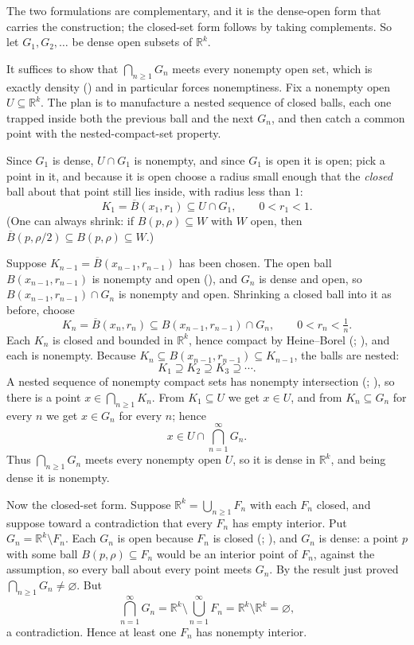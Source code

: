 \documentclass[main.tex]{subfiles}
\begin{document}
\begin{SolutionBlue}
The two formulations are complementary, and it is the dense-open form that carries the construction; the closed-set form follows by taking complements. So let $G_1,G_2,\dots$ be dense open subsets of $\mathbb R^k$.

It suffices to show that $\bigcap_{n\ge 1}G_n$ meets every nonempty open set, which is exactly density () and in particular forces nonemptiness. Fix a nonempty open $U\subseteq\mathbb R^k$. The plan is to manufacture a nested sequence of closed balls, each one trapped inside both the previous ball and the next $G_n$, and then catch a common point with the nested-compact-set property.

Since $G_1$ is dense, $U\cap G_1$ is nonempty, and since $G_1$ is open it is open; pick a point in it, and because it is open choose a radius small enough that the \emph{closed} ball about that point still lies inside, with radius less than $1$:
\[
  K_1=\overline B(x_1,r_1)\subseteq U\cap G_1,\qquad 0<r_1<1 .
\]
(One can always shrink: if $B(p,\rho)\subseteq W$ with $W$ open, then $\overline B(p,\rho/2)\subseteq B(p,\rho)\subseteq W$.)

Suppose $K_{n-1}=\overline B(x_{n-1},r_{n-1})$ has been chosen. The open ball $B(x_{n-1},r_{n-1})$ is nonempty and open (), and $G_n$ is dense and open, so $B(x_{n-1},r_{n-1})\cap G_n$ is nonempty and open. Shrinking a closed ball into it as before, choose
\[
  K_n=\overline B(x_n,r_n)\subseteq B(x_{n-1},r_{n-1})\cap G_n,\qquad 0<r_n<\tfrac1n .
\]
Each $K_n$ is closed and bounded in $\mathbb R^k$, hence compact by Heine--Borel (; ), and each is nonempty. Because $K_n\subseteq B(x_{n-1},r_{n-1})\subseteq K_{n-1}$, the balls are nested:
\[
  K_1\supseteq K_2\supseteq K_3\supseteq\cdots .
\]
A nested sequence of nonempty compact sets has nonempty intersection (; ), so there is a point $x\in\bigcap_{n\ge 1}K_n$. From $K_1\subseteq U$ we get $x\in U$, and from $K_n\subseteq G_n$ for every $n$ we get $x\in G_n$ for every $n$; hence
\[
  x\in U\cap\bigcap_{n=1}^{\infty}G_n .
\]
Thus $\bigcap_{n\ge 1}G_n$ meets every nonempty open $U$, so it is dense in $\mathbb R^k$, and being dense it is nonempty.

Now the closed-set form. Suppose $\mathbb R^k=\bigcup_{n\ge 1}F_n$ with each $F_n$ closed, and suppose toward a contradiction that every $F_n$ has empty interior. Put $G_n=\mathbb R^k\setminus F_n$. Each $G_n$ is open because $F_n$ is closed (; ), and $G_n$ is dense: a point $p$ with some ball $B(p,\rho)\subseteq F_n$ would be an interior point of $F_n$, against the assumption, so every ball about every point meets $G_n$. By the result just proved $\bigcap_{n\ge 1}G_n\neq\varnothing$. But
\[
  \bigcap_{n=1}^{\infty}G_n=\mathbb R^k\setminus\bigcup_{n=1}^{\infty}F_n=\mathbb R^k\setminus\mathbb R^k=\varnothing ,
\]
a contradiction. Hence at least one $F_n$ has nonempty interior.
\end{SolutionBlue}
\end{document}
